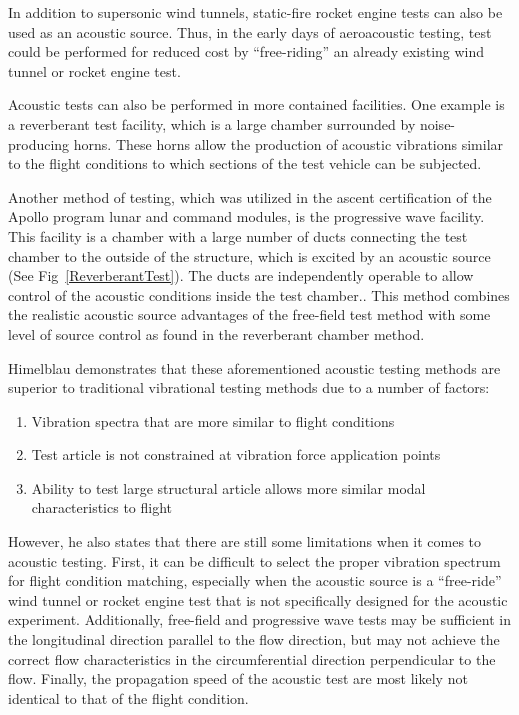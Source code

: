\documentclass[]{aiaa-tc}%
\begin{document}
In addition to supersonic wind tunnels, static-fire rocket engine tests can also be used as an acoustic source.  Thus, in the early days of aeroacoustic testing, test could be performed for reduced cost by ``free-riding'' an already existing wind tunnel or rocket engine test.

Acoustic tests can also be performed in more contained facilities.  One example is a reverberant test facility, which is a large chamber surrounded by noise-producing horns.\cite{ReverberantChamber}  These horns allow the production of acoustic vibrations similar to the flight conditions to which sections of the test vehicle can be subjected.

Another method of testing, which was utilized in the ascent certification of the Apollo program lunar and command modules, is the progressive wave facility.  This facility is a chamber with a large number of ducts connecting the test chamber to the outside of the structure, which is excited by an acoustic source (See Fig~\ref{ReverberantTest}).  The ducts are independently operable to allow control of the acoustic conditions inside the test chamber.\cite{ProgressiveWaveChamber}.  This method combines the realistic acoustic source advantages of the free-field test method with some level of source control as found in the reverberant chamber method.





Himelblau demonstrates that these aforementioned acoustic testing methods are superior to traditional vibrational testing methods due to a number of factors:
\begin{enumerate}
  \item Vibration spectra that are more similar to flight conditions
  \item Test article is not constrained at vibration force application points
  \item Ability to test large structural article allows more similar modal characteristics to flight
\end{enumerate}

However, he also states that there are still some limitations when it comes to acoustic testing.  First, it can be difficult to select the proper vibration spectrum for flight condition matching, especially when the acoustic source is a ``free-ride'' wind tunnel or rocket engine test that is not specifically designed for the acoustic experiment.  Additionally, free-field and progressive wave tests may be sufficient in the longitudinal direction parallel to the flow direction, but may not achieve the correct flow characteristics in the circumferential direction perpendicular to the flow.  Finally, the propagation speed of the acoustic test are most likely not identical to that of the flight condition.
\end{document}
